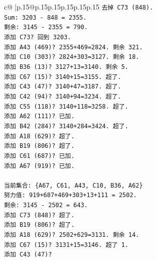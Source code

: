 \documentclass{article}
\begin{document}
{\begin{supertabular}{c@{$\;$}|p{.15\linewidth}@{}p{.15\linewidth}p{.15\linewidth}p{.15\linewidth}p{.15\linewidth}p{.15\linewidth}}
{{{\texttt{去掉 C73 (848).} \\
\texttt{Sum: 3203 {-} 848 = 2355.} \\
\texttt{剩余: 3145 {-} 2355 = 790.} \\
\texttt{添加 C73? 回到 3203.} \\
\texttt{添加 A43 (469)? 2355+469=2824. 剩余 321.} \\
\texttt{添加 C10 (303)? 2824+303=3127. 剩余 18.} \\
\texttt{添加 B36 (13)? 3127+13=3140. 剩余 5.} \\
\texttt{添加 C67 (15)? 3140+15=3155. 超了.} \\
\texttt{添加 C43 (47)? 3140+47=3187. 超了.} \\
\texttt{添加 C42 (94)? 3140+94=3234. 超了.} \\
\texttt{添加 C55 (118)? 3140+118=3258. 超了.} \\
\texttt{添加 A62 (111)? 已加.} \\
\texttt{添加 B42 (284)? 3140+284=3424. 超了.} \\
\texttt{添加 A18 (629)? 超了.} \\
\texttt{添加 B19 (806)? 超了.} \\
\texttt{添加 C61 (687)? 已加.} \\
\texttt{添加 A67 (919)? 已加.} \\
\\ 
\texttt{当前集合: \{A67, C61, A43, C10, B36, A62\}} \\
\texttt{努力值: 919+687+469+303+13+111 = 2502.} \\
\texttt{剩余: 3145 {-} 2502 = 643.} \\
\texttt{添加 C73 (848)? 超了.} \\
\texttt{添加 B19 (806)? 超了.} \\
\texttt{添加 A18 (629)? 2502+629=3131. 剩余 14.} \\
\texttt{添加 C67 (15)? 3131+15=3146. 超了 1.} \\
\texttt{添加 C43 (47)?} \\
            }
        }
    }
     \\ \\


\end{supertabular}}
\end{document}
